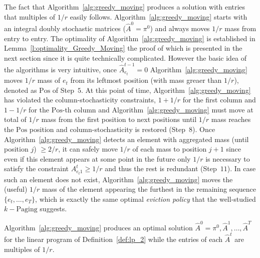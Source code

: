 The fact that Algorithm~\ref{alg:greedy_moving} produces a solution with entries that multiples of $1/r$ easily follows. Algorithm~\ref{alg:greedy_moving} starts with an integral doubly stochastic matrices ($\hat{A}^0 = \pi^0$) and always moves $1/r$ mass from entry to entry. The optimality of Algorithm~\ref{alg:greedy_moving} is established in Lemma~\ref{l:optimality_Greedy_Moving} the proof of which is presented in the next section since it is quite technically complicated. However the basic idea of the algorithms is very intuitive, once $\hat{A}^{t-1}_{e_t} = 0$ Algorithm~\ref{alg:greedy_moving} moves $1/r$ mass of $e_t$ from its leftmost position (with mass greaer than $1/r$), denoted as $\mathrm{Pos}$ of Step~$5$. At this point of time, Algorithm~\ref{alg:greedy_moving} has violated the column-stochasticity constraints, $1+1/r$ for the first column and $1-1/r$ for the $\mathrm{Pos}$-th column and Algorithm~\ref{alg:greedy_moving} must move at total of $1/r$ mass from the first position to next positions until $1/r$ mass reaches the $\mathrm{Pos}$ position and column-stochasticity is restored (Step~$8$). Once Algorithm~\ref{alg:greedy_moving} detects an element with aggregated mass (until position $j$) $\geq 2/r$, it can safely move $1/r$ of each mass to position $j+1$ since even if this element appears at some point in the future only $1/r$ is necessary to satisfy the constraint $A_{e_t 1}^t \geq 1/r$ and thus the rest is redundant (Step~$11$). In case such an element does not exist, Algorithm~\ref{alg:greedy_moving} moves the (useful) $1/r$ mass of the element appearing the furthest in the remaining sequence $\{e_t,\ldots,e_{T}\}$, which is exactly the same optimal \textit{eviction policy} that the well-studied $k-\mathrm{Paging}$ suggests. 

\begin{lemma}\label{l:optimality_Greedy_Moving} Algorithm~\ref{alg:greedy_moving} produces an optimal solution $\hat{A}^0=\pi^0,\hat{A}^1,\ldots,\hat{A}^T$ for the linear program of Definition~\ref{def:lp_2} while the entries of each $\hat{A}^t$ are multiples of $1/r$.
\end{lemma}


